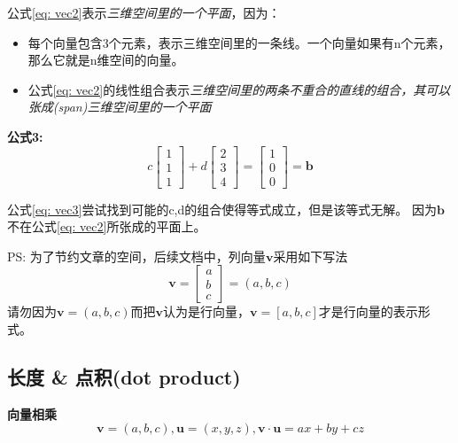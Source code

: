 \documentclass{book}
\begin{document}
  公式\ref{eq: vec2}表示\textit{三维空间里的一个平面}，因为：
  \begin{itemize}
    \item 每个向量包含3个元素，表示三维空间里的一条线。一个向量如果有n个元素，那么它就是n维空间的向量。
    \item 公式\ref{eq: vec2}的线性组合表示\textit{三维空间里的两条不重合的直线的组合，其可以张成(span)三维空间里的一个平面}
  \end{itemize}

\textbf{公式3:}
\begin{equation}
  c\left[\begin{array}{c}
  1\\1\\1
\end{array}\right]+
  d\left[\begin{array}{c}
    2\\3\\4
  \end{array}\right]=
  \left[
    \begin{array}{c}
      1\\0\\0
    \end{array}
    \right]=\boldsymbol{b}
  \label{eq: vec3}
\end{equation}

公式\ref{eq: vec3}尝试找到可能的c,d的组合使得等式成立，但是该等式无解。
因为$\boldsymbol{b}$不在公式\ref{eq: vec2}所张成的平面上。


PS: 为了节约文章的空间，后续文档中，列向量$\boldsymbol{v}$采用如下写法
\begin{equation*}
  \boldsymbol{v}=\left[
      \begin{array}{c}
        a\\b\\c
      \end{array}
      \right]=\left(a, b, c\right)
\end{equation*}
请勿因为$\boldsymbol{v}=\left(a, b, c\right)$而把$\boldsymbol{v}$认为是行向量，$\boldsymbol{v}=\left[a, b, c\right]$才是行向量的表示形式。

\subsection{长度 \& 点积(dot product)}
\textbf{向量相乘}
\begin{equation}
  \boldsymbol{v}=(a, b, c), \boldsymbol{u}=(x, y, z), \boldsymbol{v}\cdot \boldsymbol{u}=ax+by+cz 
  \label{eq: dotProduct1}
\end{equation}
\end{document}
